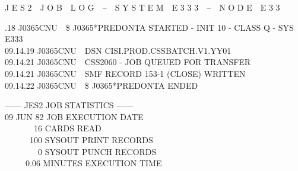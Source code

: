 
{\scriptsize\ttfamily J E S 2~~J O B~~L O G~~--~~S Y S T E M~~E 3 3 3~~--~~N O D E~~E 3 3}

{\scriptsize{}.18 J0365CNU~~\$ J0365*PREDONTA STARTED - INIT 10 - CLASS Q - SYS E333\\
09.14.19 J0365CNU~~DSN CISI.PROD.CSSBATCH.V1.YY01\\
09.14.21 J0365CNU~~CSS2060 - JOB QUEUED FOR TRANSFER\\
09.14.21 J0365CNU~~SMF RECORD 153-1 (CLOSE) WRITTEN\\
09.14.22 J0365CNU~~\$ J0365*PREDONTA ENDED}

{\scriptsize\ttfamily ------ JES2 JOB STATISTICS ------\\[1em]
09 JUN 82 JOB EXECUTION DATE\\[1em]
~~~~~~~16 CARDS READ\\[1em]
~~~~~~100 SYSOUT PRINT RECORDS\\[1em]
~~~~~~~~0 SYSOUT PUNCH RECORDS\\[1em]
~~~~~0.06 MINUTES EXECUTION TIME}

